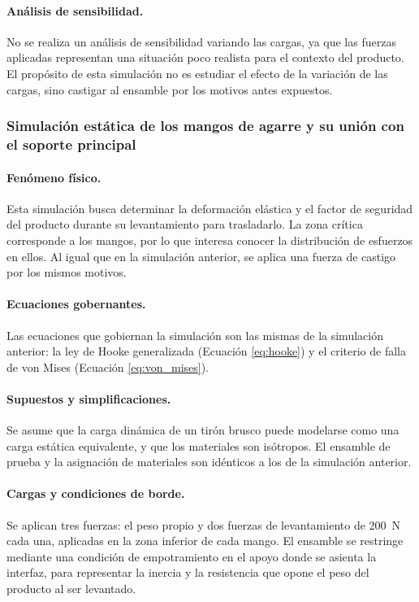 \documentclass[12pt, a4paper]{article}
\begin{document}
\paragraph{Análisis de sensibilidad.} No se realiza un análisis de sensibilidad variando las cargas, ya que las fuerzas aplicadas representan una situación poco realista para el contexto del producto. El propósito de esta simulación no es estudiar el efecto de la variación de las cargas, sino castigar al ensamble por los motivos antes expuestos.

\subsubsection{Simulación estática de los mangos de agarre y su unión con el soporte principal}

\paragraph{Fenómeno físico.} Esta simulación busca determinar la deformación elástica y el factor de seguridad del producto durante su levantamiento para trasladarlo. La zona crítica corresponde a los mangos, por lo que interesa conocer la distribución de esfuerzos en ellos. Al igual que en la simulación anterior, se aplica una fuerza de castigo por los mismos motivos.

\paragraph{Ecuaciones gobernantes.} Las ecuaciones que gobiernan la simulación son las mismas de la simulación anterior: la ley de Hooke generalizada (Ecuación \eqref{eq:hooke}) y el criterio de falla de von Mises (Ecuación \eqref{eq:von_mises}).

\paragraph{Supuestos y simplificaciones.} Se asume que la carga dinámica de un tirón brusco puede modelarse como una carga estática equivalente, y que los materiales son isótropos. El ensamble de prueba y la asignación de materiales son idénticos a los de la simulación anterior.

\paragraph{Cargas y condiciones de borde.} Se aplican tres fuerzas: el peso propio y dos fuerzas de levantamiento de \SI{200}{\newton} cada una, aplicadas en la zona inferior de cada mango. El ensamble se restringe mediante una condición de empotramiento en el apoyo donde se asienta la interfaz, para representar la inercia y la resistencia que opone el peso del producto al ser levantado.
\end{document}
